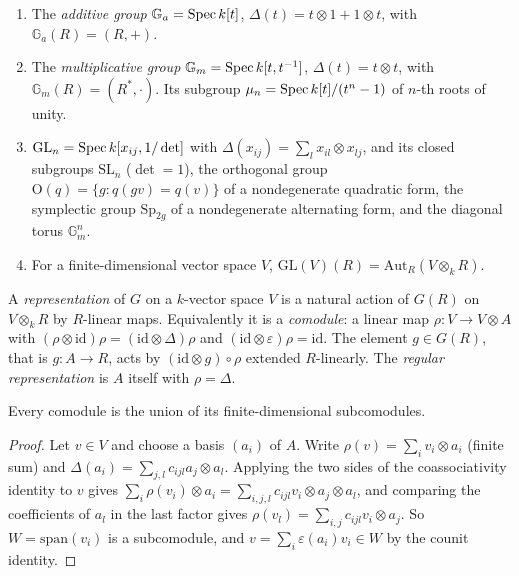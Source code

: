 \begin{example}\label{algebraic-groups:example-groups}
\begin{enumerate}
\item The \emph{additive group} $\mathbb{G}_a = \operatorname{Spec} k[t]$, $\Delta(t) = t \otimes 1 + 1 \otimes t$, with $\mathbb{G}_a(R) = (R, +)$.
\item The \emph{multiplicative group} $\mathbb{G}_m = \operatorname{Spec} k[t, t^{-1}]$, $\Delta(t) = t \otimes t$, with $\mathbb{G}_m(R) = (R^*, \cdot)$. Its subgroup $\mu_n = \operatorname{Spec} k[t]/(t^n - 1)$ of
$n$-th roots of unity.
\item $\mathrm{GL}_n = \operatorname{Spec} k[x_{ij}, 1/\det]$ with $\Delta(x_{ij}) = \sum_lx_{il} \otimes x_{lj}$, and its closed subgroups $\mathrm{SL}_n$ ($\det = 1$), the orthogonal group
$\mathrm{O}(q) = \{g : q(gv) = q(v)\}$ of a nondegenerate quadratic form, the symplectic group $\mathrm{Sp}_{2g}$ of a nondegenerate alternating form, and the
diagonal torus $\mathbb{G}_m^n$.
\item For a finite-dimensional vector space $V$, $\mathrm{GL}(V)(R) = \mathrm{Aut}_R(V \otimes_kR)$.
\end{enumerate}
\end{example}

\begin{definition}\label{algebraic-groups:definition-representation}
A \emph{representation} of $G$ on a $k$-vector space $V$ is a natural action of $G(R)$ on $V \otimes_kR$ by $R$-linear maps. Equivalently it is a \emph{comodule}: a linear map
$\rho \colon V \to V \otimes A$ with $(\rho \otimes \mathrm{id})\rho = (\mathrm{id} \otimes \Delta)\rho$ and $(\mathrm{id} \otimes \varepsilon)\rho = \mathrm{id}$. The element $g \in G(R)$,
that is $g \colon A \to R$, acts by $(\mathrm{id} \otimes g) \circ \rho$ extended $R$-linearly. The \emph{regular representation} is $A$ itself with $\rho = \Delta$.
\end{definition}

\begin{lemma}\label{algebraic-groups:lemma-locally-finite}
Every comodule is the union of its finite-dimensional subcomodules.
\end{lemma}

\begin{proof}
Let $v \in V$ and choose a basis $(a_i)$ of $A$. Write $\rho(v) = \sum_iv_i \otimes a_i$ (finite sum) and $\Delta(a_i) = \sum_{j,l}c_{ijl}a_j \otimes a_l$. Applying the two sides of
the coassociativity identity to $v$ gives $\sum_i\rho(v_i) \otimes a_i = \sum_{i,j,l}c_{ijl}v_i \otimes a_j \otimes a_l$, and comparing the coefficients of $a_l$ in the last factor gives
$\rho(v_l) = \sum_{i,j}c_{ijl}v_i \otimes a_j$. So $W = \mathrm{span}(v_i)$ is a subcomodule, and $v = \sum_i\varepsilon(a_i)v_i \in W$ by the counit identity.
\end{proof}


